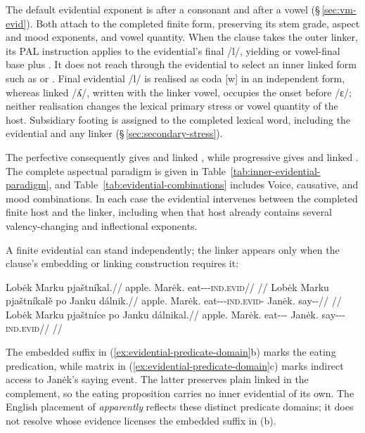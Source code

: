 The default evidential exponent is  after a consonant and
 after a vowel (§\,\ref{sec:vm-evid}). Both attach to the completed
finite form, preserving its stem grade, aspect and mood exponents, and vowel
quantity. When the clause takes the outer linker, its PAL instruction applies
to the evidential's final /l/, yielding  or vowel-final base plus
. It does not reach through the evidential to select an inner linked
form such as  or . Final evidential /l/
is realised as coda [w] in an independent form, whereas linked /ʎ/,
written  with the linker vowel, occupies the onset before /ɛ/; neither realisation changes the lexical
primary stress or vowel quantity of the host. Subsidiary footing is assigned
to the completed lexical word, including the evidential and any linker
(§\,\ref{sec:secondary-stress}).

The perfective  consequently gives  and
linked , while progressive  gives
 and linked . The complete aspectual
paradigm is given in Table~\ref{tab:inner-evidential-paradigm}, and
Table~\ref{tab:evidential-combinations} includes Voice, causative, and mood
combinations. In each case the evidential intervenes between the completed
finite host and the linker, including when that host already contains several
valency-changing and inflectional exponents.

A finite evidential can stand independently; the linker appears only when the
clause's embedding or linking construction requires it:

\pex\label{ex:evidential-predicate-domain}%
\a
\begingl
\gla Lobėk Marku pjaštníkal.//
\glb apple.\Dir{} Marėk.\Trs{} eat-\Trs{}-\Pf{}-\textsc{ind.evid}//
\glft {}//
\endgl
\a
\begingl
\gla Lobėk Marku pjaštníkalě po Janku dálnik.//
\glb apple.\Dir{} Marėk.\Trs{} eat-\Trs{}-\Pf{}-\textsc{ind.evid}-\Lnk{} \Compl{} Janėk.\Trs{} say-\Trs{}-\Pf{}//
\glft {}//
\endgl
\a
\begingl
\gla Lobėk Marku pjaštníce po Janku dálnikal.//
\glb apple.\Dir{} Marėk.\Trs{} eat-\Trs{}-\Pf{}-\Lnk{} \Compl{} Janėk.\Trs{} say-\Trs{}-\Pf{}-\textsc{ind.evid}//
\glft {}
//
\endgl
\xe

The embedded suffix in (\ref{ex:evidential-predicate-domain}b) marks the
eating predication, while matrix  in
(\ref{ex:evidential-predicate-domain}c) marks indirect access to Janėk's
saying event. The latter preserves plain linked  in the
complement, so the eating proposition carries no inner evidential of its
own. The English placement of \textit{apparently} reflects these distinct
predicate domains; it does not resolve whose evidence licenses the
embedded suffix in (b).

